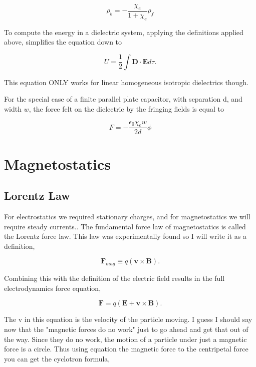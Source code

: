 \documentclass[preprint, review,12pt]{elsarticle}
\def\x{\times}
\def\.{\cdot}
\def\b{\textbf}
\def\={\equiv}
\begin{document}
\begin{equation}
    \rho_b = - \frac{\chi_e}{1+\chi_e}\rho_f
\end{equation}

To compute the energy in a dielectric system, applying the definitions applied above, simplifies the equation down to

\begin{equation}
    U = \frac{1}{2}\int \b{D}\. \b{E}d\tau.
\end{equation}

This equation ONLY works for linear homogeneous isotropic dielectrics though.

For the special case of a finite parallel plate capacitor, with separation d, and width $w$, the force felt on the dielectric by the fringing fields is equal to 

\begin{equation}
    F = -\frac{\epsilon_0\chi_ew}{2d}\phi
\end{equation}

\section{Magnetostatics}

\subsection{Lorentz Law}

For electrostatics we required stationary charges, and for magnetostatics we will require steady currents.. The fundamental force law of magnetostatics is called the Lorentz force law. This law was experimentally found so I will write it as a definition,

\begin{equation}
    \b{F}_{mag} \= q(\b{v} \x \b{B}).
\end{equation}

Combining this with the definition of the electric field results in the full electrodynamics force equation,

\begin{equation}
    \b{F} = q(\b{E} + \b{v} \x \b{B}).
\end{equation}

The v in this equation is the velocity of the particle moving. I guess I should say now that the "magnetic forces do no work" just to go ahead and get that out of the way. Since they do no work, the motion of a particle under just a magnetic force is a circle. Thus using equation the magnetic force to the centripetal force you can get the cyclotron formula,
\end{document}

